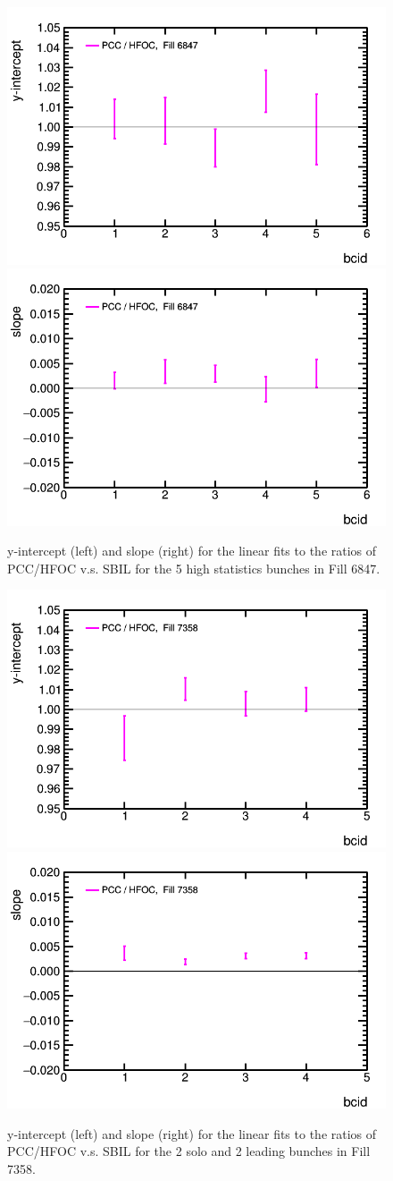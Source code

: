 \clearpage
\begin{figure}[t]
  \begin{center}
    \includegraphics[width=0.47\linewidth]{plots/sbilratios_singles/plot_det_linearity_perbx_y0_6847.png}
    \includegraphics[width=0.47\linewidth]{plots/sbilratios_singles/plot_det_linearity_perbx_slope_6847.png}
    \caption{
      y-intercept (left) and slope (right) for the linear fits to the ratios of PCC/HFOC v.s. SBIL for the 5 high statistics bunches in Fill 6847.
      \label{fig:sbilratiosresults6847}
    }
  \end{center}
\end{figure}

\begin{figure}[t]
  \begin{center}
    \includegraphics[width=0.47\linewidth]{plots/sbilratios_singles/plot_det_linearity_perbx_y0_7358.png}
    \includegraphics[width=0.47\linewidth]{plots/sbilratios_singles/plot_det_linearity_perbx_slope_7358.png}
    \caption{
      y-intercept (left) and slope (right) for the linear fits to the ratios of PCC/HFOC v.s. SBIL for the 2 solo and 2 leading  bunches in Fill 7358.
      \label{fig:sbilratiosresults7358}
    }
  \end{center}
\end{figure}



